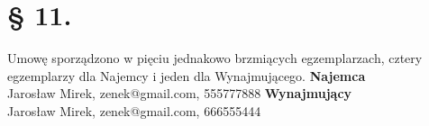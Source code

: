 \documentclass[a4paper,11pt, notitlepage]{article}
\begin{document}
\section*{§ 11.}
Umowę sporządzono w pięciu jednakowo brzmiących egzemplarzach, cztery egzemplarzy dla Najemcy i jeden dla Wynajmującego.
\newline
\vspace{40pt}
\Large{\textbf{Najemca}} \\
Jarosław Mirek, zenek@gmail.com, 555777888
\newline
\vspace{60pt}
\Large{\textbf{Wynajmujący}}\\
Jarosław Mirek, zenek@gmail.com, 666555444
\end{document}
